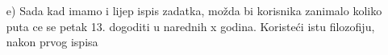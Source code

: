 \documentclass{exam}
\begin{document}
\begin{itemize}
                                                                                \item[e)]
                                                                                    Sada
                                                                                    kad
                                                                                    imamo
                                                                                    i
                                                                                    lijep
                                                                                    ispis
                                                                                    zadatka,
                                                                                    možda
                                                                                    bi
                                                                                    korisnika
                                                                                    zanimalo
                                                                                    koliko
                                                                                    puta
                                                                                    ce
                                                                                    se
                                                                                    petak
                                                                                    13.
                                                                                    dogoditi
                                                                                    u
                                                                                    narednih
                                                                                    x
                                                                                    godina.
                                                                                    Koristeći
                                                                                    istu
                                                                                    filozofiju,
                                                                                    nakon
                                                                                    prvog
                                                                                    ispisa

\end{itemize}
\end{document}
